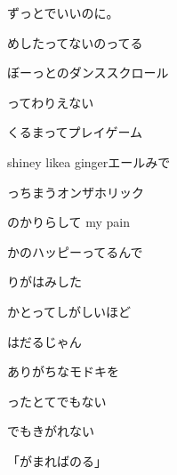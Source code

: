 \documentclass[a4paper,tate,twocolumn,12pt]{ltjtarticle}
\begin{document}
\thispagestyle{empty}

\begin{center}
{\LARGE {}}

{\large ずっとでいいのに。}
\end{center}

\vspace{1em}

\begin{flushleft}

\noindent\begin{minipage}{\linewidth}
めしたってないのってる

ぼーっとのダンススクロール

ってわりえない

くるまってプレイゲーム
\end{minipage}

\vspace{2em}

\noindent\begin{minipage}{\linewidth}
shiney likea gingerエールみで

っちまうオンザホリック

のかりらして my pain

かのハッピーってるんで
\end{minipage}

\vspace{2em}

\noindent\begin{minipage}{\linewidth}
りがはみした

かとってしがしいほど

はだるじゃん

ありがちなモドキを

ったとてでもない

でもきがれない

「がまればのる」
\end{minipage}


\end{flushleft}
\end{document}
